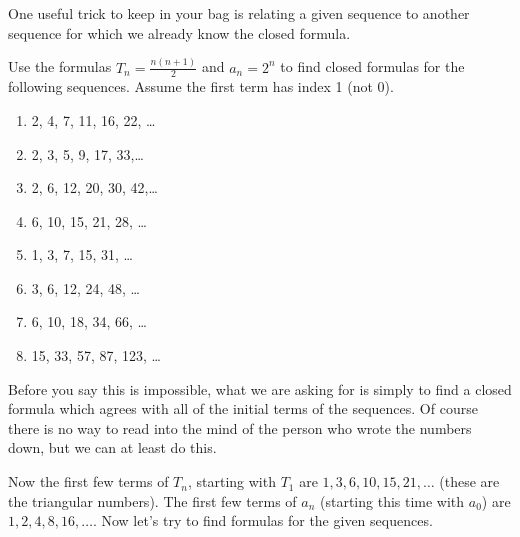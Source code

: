 \documentclass[12pt]{article}
\begin{document}
One useful trick to keep in your bag is relating a given sequence to another sequence for which we already know the closed formula.

\begin{example}
  Use the formulas $T_n = \frac{n(n+1)}{2}$ and $a_n = 2^n$ to find closed formulas for the following sequences.  Assume the first term has index 1 (not 0).
  \begin{enumerate}
    \item 2, 4, 7, 11, 16, 22, \ldots
    \item 2, 3, 5, 9, 17, 33,\ldots
    \item 2, 6, 12, 20, 30, 42,\ldots
    \item 6, 10, 15, 21, 28, \ldots
    \item 1, 3, 7, 15, 31, \ldots
    \item 3, 6, 12, 24, 48, \ldots
    \item 6, 10, 18, 34, 66, \ldots
    \item 15, 33, 57, 87, 123, \ldots
  \end{enumerate}

\begin{solution}
  Before you say this is impossible, what we are asking for is simply to find a closed formula which agrees with all of the initial terms of the sequences.  Of course there is no way to read into the mind of the person who wrote the numbers down, but we can at least do this.
  
  Now the first few terms of $T_n$, starting with $T_1$ are $1, 3, 6, 10, 15, 21, \ldots$ (these are the triangular numbers).  The first few terms of $a_n$ (starting this time with $a_0$) are $1, 2, 4, 8, 16, \ldots$.  Now let's try to find formulas for the given sequences.
  

\end{solution}
\end{example}
\end{document}
